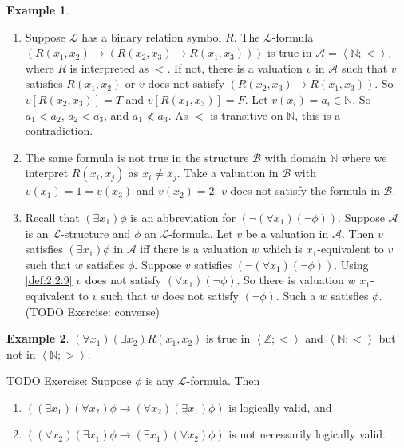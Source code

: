 \documentclass{article}
\newcommand{\N}{\mathbb{N}}
\newcommand{\Z}{\mathbb{Z}}
\newcommand{\rb}[1]{\left( #1 \right)}
\renewcommand{\sb}[1]{\left[ #1 \right]}
\newcommand{\ab}[1]{\left\langle #1 \right\rangle}
\newcommand{\notb}[1]{\rb{\neg #1}}
\newcommand{\impb}[2]{\rb{#1 \rightarrow #2}}
\newcommand{\fab}[1]{\rb{\forall #1}}
\newcommand{\teb}[1]{\rb{\exists #1}}
\theoremstyle{definition}\newtheorem{definition}{Definition}[subsection]
\theoremstyle{definition}\newtheorem{remark}[definition]{Remark}
\theoremstyle{definition}\newtheorem*{example}{Example}
\theoremstyle{definition}\newtheorem*{note}{Note}
\begin{document}
\begin{example}
\hfill
\begin{enumerate}
\item Suppose $ \mathcal{L} $ has a binary relation symbol $ R $. The $ \mathcal{L} $-formula $ \impb{R\rb{x_1, x_2}}{\impb{R\rb{x_2, x_3}}{R\rb{x_1, x_3}}} $ is true in $ \mathcal{A} = \ab{\N; <} $, where $ R $ is interpreted as $ < $. If not, there is a valuation $ v $ in $ \mathcal{A} $ such that $ v $ satisfies $ R\rb{x_1, x_2} $ or $ v $ does not satisfy $ \impb{R\rb{x_2, x_3}}{R\rb{x_1, x_3}} $. So $ v\sb{R\rb{x_2, x_3}} = T $ and $ v\sb{R\rb{x_1, x_3}} = F $. Let $ v\rb{x_i} = a_i \in \N $. So $ a_1 < a_2 $, $ a_2 < a_3 $, and $ a_1 \not< a_3 $. As $ < $ is transitive on $ \N $, this is a contradiction.
\item The same formula is not true in the structure $ \mathcal{B} $ with domain $ \N $ where we interpret $ R\rb{x_i, x_j} $ as $ x_i \ne x_j $. Take a valuation in $ \mathcal{B} $ with $ v\rb{x_1} = 1 = v\rb{x_3} $ and $ v\rb{x_2} = 2 $. $ v $ does not satisfy the formula in $ \mathcal{B} $.
\item Recall that $ \teb{x_1}\phi $ is an abbreviation for $ \notb{\fab{x_1}\notb{\phi}} $. Suppose $ \mathcal{A} $ is an $ \mathcal{L} $-structure and $ \phi $ an $ \mathcal{L} $-formula. Let $ v $ be a valuation in $ \mathcal{A} $. Then $ v $ satisfies $ \teb{x_1}\phi $ in $ \mathcal{A} $ iff there is a valuation $ w $ which is $ x_1 $-equivalent to $ v $ such that $ w $ satisfies $ \phi $. Suppose $ v $ satisfies $ \notb{\fab{x_1}\notb{\phi}} $. Using \ref{def:2.2.9} $ v $ does not satisfy $ \fab{x_1}\notb{\phi} $. So there is valuation $ w $ $ x_1 $-equivalent to $ v $ such that $ w $ does not satisfy $ \notb{\phi} $. Such a $ w $ satisfies $ \phi $. (TODO Exercise: converse)
\end{enumerate}
\end{example}

\begin{example}
$ \fab{x_1}\teb{x_2}R\rb{x_1, x_2} $ is true in $ \ab{\Z; <} $ and $ \ab{\N; <} $ but not in $ \ab{\N; >} $.
\end{example}

TODO Exercise: Suppose $ \phi $ is any $ \mathcal{L} $-formula. Then
\begin{enumerate}
\item $ \impb{\teb{x_1}\fab{x_2}\phi}{\fab{x_2}\teb{x_1}\phi} $ is logically valid, and
\item $ \impb{\fab{x_2}\teb{x_1}\phi}{\teb{x_1}\fab{x_2}\phi} $ is not necessarily logically valid.
\end{enumerate}
\end{document}
